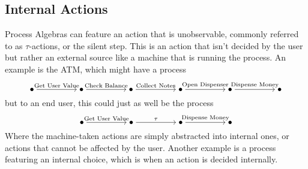 \documentclass[../hons_project.tex]{subfiles}
\begin{document}
\subsection{Internal Actions}\label{ssec:internal-actions}
Process Algebras can feature an action that is unobservable, commonly referred to as $\tau$-actions, or the silent step. This is an action that isn't decided by the user but rather an external source like a machine that is running the process. An example is the ATM, which might have a process
\begin{equation}
\begin{tikzcd}[cramped]
		\bullet && \bullet && \bullet && \bullet && \bullet && \bullet
		\arrow["{\text{Get User Value}}", from=1-1, to=1-3]
		\arrow["{\text{Check Balance}}", from=1-3, to=1-5]
		\arrow["{\text{Collect Notes}}", from=1-5, to=1-7]
		\arrow["{\text{Open Dispenser}}", from=1-7, to=1-9]
		\arrow["{\text{Dispense Money}}", from=1-9, to=1-11]
	\end{tikzcd}
\end{equation}
but to an end user, this could just as well be the process
\begin{equation}
	\begin{tikzcd}[cramped]
		\bullet && \bullet && \bullet && \bullet
		\arrow["{\text{Get User Value}}", from=1-1, to=1-3]
		\arrow["\tau", from=1-3, to=1-5]
		\arrow["{\text{Dispense Money}}", from=1-5, to=1-7]
	\end{tikzcd}
\end{equation}
Where the machine-taken actions are simply abstracted into internal ones, or actions that cannot be affected by the user. Another example is a process featuring an internal choice, which is when an action is decided internally.
\end{document}
